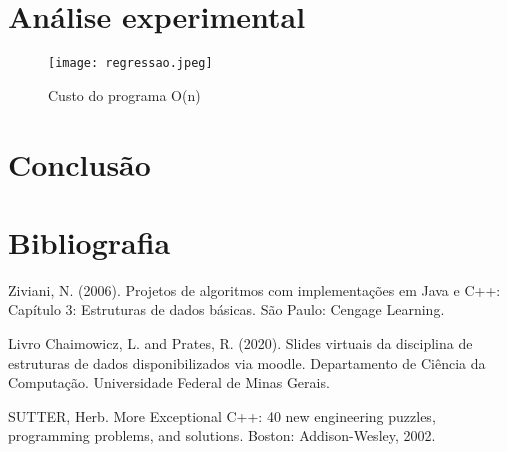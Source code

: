 \documentclass{article}
\begin{document}
\section{Análise experimental}

 \begin{figure}[H]
    \centering
    \texttt{[image: regressao.jpeg]}
    \caption{Custo do programa O(n)}
    \label{fig:minha-imagem}
\end{figure}
\vspace{1cm}




\section{Conclusão}


\section {Bibliografia}

Ziviani, N. (2006). Projetos de algoritmos com implementações em Java e C++: Capítulo 3: Estruturas de dados básicas. São Paulo: Cengage Learning.
\par Livro Chaimowicz, L. and Prates, R. (2020). Slides virtuais da disciplina de estruturas de dados
disponibilizados via moodle. Departamento de Ciência da Computação. Universidade Federal de
Minas Gerais.

\par SUTTER, Herb. More Exceptional C++: 40 new engineering puzzles, programming problems, and solutions. Boston: Addison-Wesley, 2002.
\end{document}
